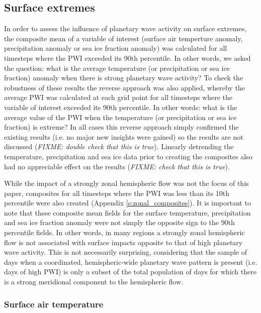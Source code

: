 \subsection{Surface extremes}

In order to assess the influence of planetary wave activity on surface extremes, the composite mean of a variable of interest (surface air temperture anomaly, precipitation anomaly or sea ice fraction anomaly) was calculated for all timesteps where the PWI exceeded its 90th percentile. In other words, we asked the question: what is the average temperature (or precipitation or sea ice fraction) anomaly when there is strong planetary wave activity? To check the robustness of these results the reverse approach was also applied, whereby the average PWI was calculated at each grid point for all timesteps where the variable of interest exceeded its 90th percentile. In other words: what is the average value of the PWI when the temperature (or precipitation or sea ice fraction) is extreme? In all cases this reverse approach simply confirmed the existing results (i.e. no major new insights were gained) so the results are not discussed (\textit{FIXME: double check that this is true}). Linearly detrending the temperature, precipitation and sea ice data prior to creating the composites also had no appreciable effect on the results (\textit{FIXME: check that this is true}).

While the impact of a strongly zonal hemispheric flow was not the focus of this paper, composites for all timesteps where the PWI was less than its 10th percentile were also created (Appendix \ref{s:zonal_composites}). It is important to note that these composite mean fields for the surface temperature, precipitation and sea ice fraction anomaly were not simply the opposite sign to the 90th percentile fields. In other words, in many regions a strongly zonal hemispheric flow is not associated with surface impacts opposite to that of high planetary wave activity. This is not necessarily surprising, considering that the sample of days when a coordinated, hemispheric-wide planetary wave pattern is present (i.e. days of high PWI) is only a subset of the total population of days for which there is a strong meridional component to the hemispheric flow.

\subsubsection{Surface air temperature}

